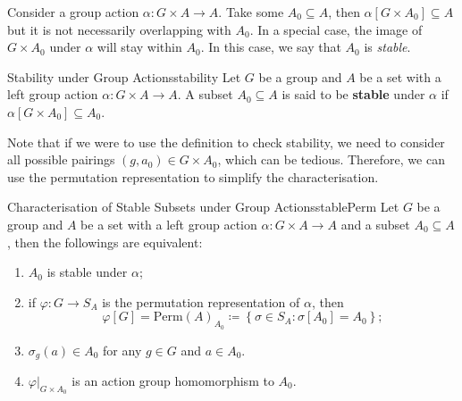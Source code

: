 \documentclass[math]{amznotes}
\theoremstyle{remark}
\newcommand{\0}{\mathbf{0}}
\newcommand{\1}{\mathbf{1}}
\begin{document}
Consider a group action $\alpha \colon G \times A \to A$. Take some $A_0 \subseteq A$, then $\alpha\left[G \times A_0\right] \subseteq A$ but it is not necessarily overlapping with $A_0$. In a special case, the image of $G \times A_0$ under $\alpha$ will stay within $A_0$. In this case, we say that $A_0$ is \textit{stable}.
\begin{dfnbox}{Stability under Group Actions}{stability}
    Let $G$ be a group and $A$ be a set with a left group action $\alpha \colon G \times A \to A$. A subset $A_0 \subseteq A$ is said to be {\color{red} \textbf{stable}} under $\alpha$ if $\alpha\left[G \times A_0\right] \subseteq A_0$.
\end{dfnbox}
Note that if we were to use the definition to check stability, we need to consider all possible pairings $\left(g, a_0\right) \in G \times A_0$, which can be tedious. Therefore, we can use the permutation representation to simplify the characterisation.
\begin{probox}{Characterisation of Stable Subsets under Group Actions}{stablePerm}
    Let $G$ be a group and $A$ be a set with a left group action $\alpha \colon G \times A \to A$ and a subset $A_0 \subseteq A$, then the followings are equivalent:
    \begin{enumerate}
        \item $A_0$ is stable under $\alpha$;
        \item if $\varphi \colon G \to S_A$ is the permutation representation of $\alpha$, then 
        \begin{equation*}
            \varphi\left[G\right] = \mathrm{Perm}\left(A\right)_{A_0} \coloneqq \left\{\sigma \in S_A \colon \sigma\left[A_0\right] = A_0\right\};
        \end{equation*}
        \item $\sigma_g\left(a\right) \in A_0$ for any $g \in G$ and $a \in A_0$.
        \item $\left.\varphi\right\rvert_{G \times A_0}$ is an action group homomorphism to $A_0$.
    \end{enumerate}
\end{probox}
\end{document}
